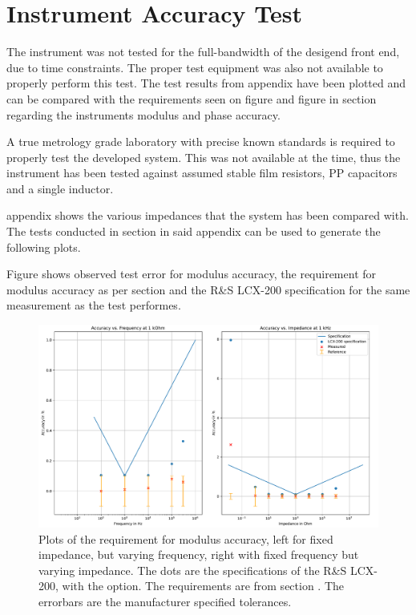 \section{Instrument Accuracy Test} \label{subsec:8_1_AccTest}
The instrument was not tested for the full-bandwidth of the desigend front end, due to time constraints. The proper test equipment was also not available to properly perform this test. The test results from appendix  have been plotted and can be compared with the requirements seen on figure  and figure  in section  regarding the instruments modulus and phase accuracy.

A true metrology grade laboratory with precise known standards is required to properly test the developed system. This was not available at the time, thus the instrument has been tested against assumed stable film resistors, PP capacitors and a single inductor.

appendix  shows the various impedances that the system has been compared with. The tests conducted in section  in said appendix can be used to generate the following plots. 

Figure  shows observed test error for modulus accuracy, the requirement for modulus accuracy as per section  and the R\&S LCX-200 specification for the same measurement as the test performes.




\begin{figure}[H]
    \centering
    \includegraphics[width=1\textwidth]{Sections/8_SystemVerification/Figures/SpecVTest.pdf}
    \caption{Plots of the requirement for modulus accuracy, left for fixed impedance, but varying frequency, right with fixed frequency but varying impedance. The dots are the specifications of the R\&S LCX-200, with the  option. The requirements are from section . The errorbars are the manufacturer specified tolerances.}
    \label{fig_8_ModulusAccuracy}
\end{figure}
  
